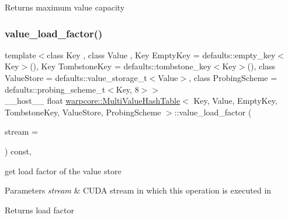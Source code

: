 \begin{DoxyReturn}{Returns}
maximum value capacity 
\end{DoxyReturn}
\mbox{\label{classwarpcore_1_1MultiValueHashTable_ad5ae5724768b34c344c95d7b4b736ab3}} 
\subsubsection{\texorpdfstring{value\+\_\+load\+\_\+factor()}{value\_load\_factor()}}
{\footnotesize\ttfamily template$<$class Key , class Value , Key Empty\+Key = defaults\+::empty\+\_\+key$<$\+Key$>$(), Key Tombstone\+Key = defaults\+::tombstone\+\_\+key$<$\+Key$>$(), class Value\+Store  = defaults\+::value\+\_\+storage\+\_\+t$<$\+Value$>$, class Probing\+Scheme  = defaults\+::probing\+\_\+scheme\+\_\+t$<$\+Key, 8$>$$>$ \\
\+\_\+\+\_\+host\+\_\+\+\_\+ float \hyperlink{classwarpcore_1_1MultiValueHashTable}{warpcore\+::\+Multi\+Value\+Hash\+Table}$<$ Key, Value, Empty\+Key, Tombstone\+Key, Value\+Store, Probing\+Scheme $>$\+::value\+\_\+load\+\_\+factor (\begin{DoxyParamCaption}\item[{cuda\+Stream\+\_\+t}]{stream = {} }\end{DoxyParamCaption}) const\hspace{0.3cm}{\ttfamily [inline]}, {\ttfamily [noexcept]}}



get load factor of the value store 


\begin{DoxyParams}{Parameters}
{\em stream} & C\+U\+DA stream in which this operation is executed in \\
\hline
\end{DoxyParams}
\begin{DoxyReturn}{Returns}
load factor 
\end{DoxyReturn}
\mbox{\label{classwarpcore_1_1MultiValueHashTable_a431ef6fae4419af72cf565430abbf7b6}} 
